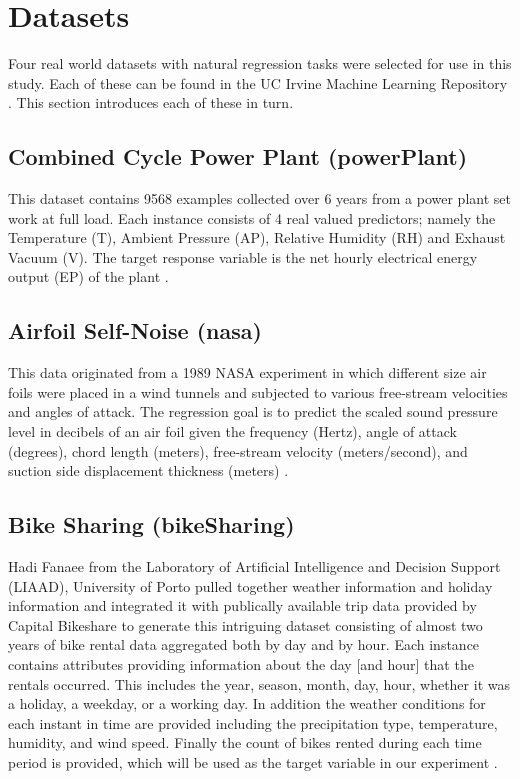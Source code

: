 \documentclass[9pt, conference]{IEEEtran}
\begin{document}
\section{Datasets}
\label{sec:datasets}
Four real world datasets with natural regression tasks were selected for use in this study. Each of these can be found in the UC Irvine Machine Learning Repository \cite{Lichman:2013}. This section introduces each of these in turn.

\subsection{Combined Cycle Power Plant (powerPlant)}
This dataset contains 9568 examples collected over 6 years from a power plant set work at full load. Each instance consists of 4 real valued predictors; namely the  Temperature (T), Ambient Pressure (AP), Relative Humidity (RH) and Exhaust Vacuum (V). The target response variable is the net hourly electrical energy output (EP) of the plant \cite{powerPlantDataset}.

\subsection{Airfoil Self-Noise (nasa)}
This data originated from a 1989 NASA experiment in which different size air foils were placed in a wind tunnels and subjected to various free-stream velocities and angles of attack. The regression goal is to predict the scaled sound pressure level in decibels of an air foil given the frequency (Hertz), angle of attack (degrees), chord length (meters), free-stream velocity (meters/second), and suction side displacement thickness (meters) \cite{airFoilDataset}.

\subsection{Bike Sharing (bikeSharing)}
Hadi Fanaee from the Laboratory of Artificial Intelligence and Decision Support (LIAAD), University of Porto pulled together weather information and holiday information and integrated it with publically available trip data provided by Capital Bikeshare to generate this intriguing dataset consisting of almost two years of bike rental data aggregated both by day and by hour. Each instance contains attributes providing information about the day [and hour] that the rentals occurred. This includes the year, season, month, day, hour, whether it was a holiday, a weekday, or a working day. In addition the weather conditions for each instant in time are provided including the precipitation type, temperature, humidity, and wind speed. Finally the count of bikes rented during each time period is provided, which will be used as the target variable in our experiment \cite{bikeSharingDataset} \cite{bikeSharingCiteRequest}. 
\end{document}
